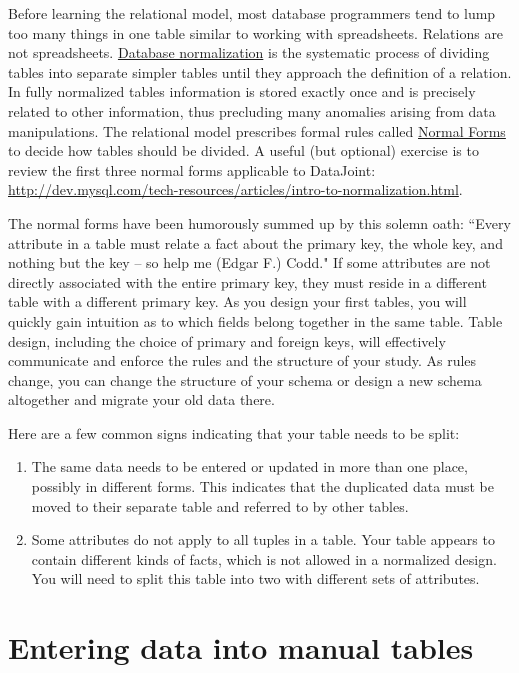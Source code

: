 \documentclass[10pt]{article}
\begin{document}
Before learning the relational model, most database programmers tend to lump too many things in one table similar to working with spreadsheets.  Relations are not spreadsheets.  \href{http://en.wikipedia.org/wiki/Database_normalization}{Database normalization} is the systematic process of dividing tables into separate simpler tables until they approach the definition of a relation. In fully normalized tables information is stored exactly once and is precisely related to other information, thus precluding many anomalies arising from data manipulations.  The relational model prescribes formal rules called \href{http://en.wikipedia.org/wiki/Database_normalization}{Normal Forms} to decide how tables should be divided.  A useful (but optional) exercise is to review the first three normal forms applicable to DataJoint: \url{http://dev.mysql.com/tech-resources/articles/intro-to-normalization.html}.

The normal forms have been humorously summed up by this solemn oath: ``Every attribute in a table must relate a fact about the primary key, the whole key, and nothing but the key -- so help me (Edgar F.) Codd."  If some attributes are not directly associated with the entire primary key, they must reside in a different table with a different primary key.  As you design your first tables, you will quickly gain intuition as to which fields belong together in the same table.  Table design, including the choice of primary and foreign keys, will effectively communicate and enforce the rules and the structure of your study.  As rules change, you can change the structure of your schema or design a new schema altogether and migrate your old data there.

Here are a few common signs indicating that your table needs to be split:
\begin{enumerate}
\item The same data needs to be entered or updated in more than one place, possibly in different forms.  This indicates that the duplicated data must be moved to their separate table and referred to by other tables. 
\item Some attributes do not apply to all tuples in a table.  Your table appears to contain different kinds of facts, which is not allowed in a normalized design. You will need to split this table into two with different sets of attributes. 
\end{enumerate}




\section{Entering data into manual tables}\label{sec:entry}
\end{document}
